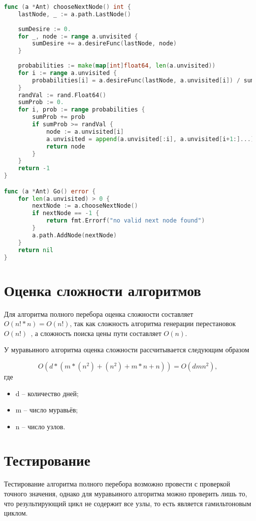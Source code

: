 \begin{lstlisting}[label=ant-strategy,caption={Алгоритм построения пути муравьём},language=go]
func (a *Ant) chooseNextNode() int {
	lastNode, _ := a.path.LastNode()
	
	sumDesire := 0.
	for _, node := range a.unvisited {
		sumDesire += a.desireFunc(lastNode, node)
	}
	
	probabilities := make(map[int]float64, len(a.unvisited))
	for i := range a.unvisited {
		probabilities[i] = a.desireFunc(lastNode, a.unvisited[i]) / sumDesire
	}
	randVal := rand.Float64()
	sumProb := 0.
	for i, prob := range probabilities {
		sumProb += prob
		if sumProb >= randVal {
			node := a.unvisited[i]
			a.unvisited = append(a.unvisited[:i], a.unvisited[i+1:]...)
			return node
		}
	}
	return -1
}

func (a *Ant) Go() error {
	for len(a.unvisited) > 0 {
		nextNode := a.chooseNextNode()
		if nextNode == -1 {
			return fmt.Errorf("no valid next node found")
		}
		a.path.AddNode(nextNode)
	}
	return nil
}
\end{lstlisting}

\section{Оценка сложности алгоритмов}

Для алгоритма полного перебора оценка сложности составляет $O(n!*n) = O(n!)$, так как сложность алгоритма генерации перестановок $O(n!)$~\cite{perms-methods}, а сложность поиска цены пути составляет $O(n)$.

У муравьиного алгоритма оценка сложности рассчитывается следующим образом

\begin{equation}
	\label{eq:ant-o}
	O(d * (m * (n^2) + (n^2) + m*n + n)) = O(dmn^2),
\end{equation}
где
\begin{itemize}
	\item d -- количество дней;
	\item m -- число муравьёв;
	\item n -- число узлов.
\end{itemize}

\section{Тестирование}

Тестирование алгоритма полного перебора  возможно провести с проверкой точного значения, однако для муравьиного алгоритма можно проверить лишь то, что результирующий цикл не содержит все узлы, то есть является гамильтоновым циклом.

